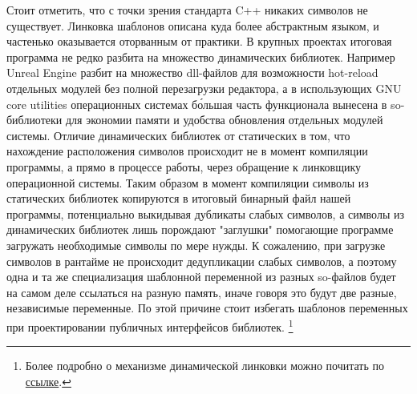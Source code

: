 Стоит отметить, что с точки зрения стандарта C++ никаких символов не существует. Линковка шаблонов описана куда более абстрактным языком, и частенько оказывается оторванным от практики. В крупных проектах итоговая программа не редко разбита на множество динамических библиотек. Например Unreal Engine разбит на множество dll-файлов для возможности hot-reload отдельных модулей без полной перезагрузки редактора, а в использующих GNU core utilities операционных системах б\'{о}льшая часть функционала вынесена в so-библиотеки для экономии памяти и удобства обновления отдельных модулей системы. Отличие динамических библиотек от статических в том, что нахождение расположения символов происходит не в момент компиляции программы, а прямо в процессе работы, через обращение к линковщику операционной системы. Таким образом в момент компиляции символы из статических библиотек копируются в итоговый бинарный файл нашей программы, потенциально выкидывая дубликаты слабых символов, а символы из динамических библиотек лишь порождают "заглушки" помогающие программе загружать необходимые символы по мере нужды. К сожалению, при загрузке символов в рантайме не происходит дедупликации слабых символов, а поэтому одна и та же специализация шаблонной переменной из разных so-файлов будет на самом деле ссылаться на разную память, иначе говоря это будут две разные, независимые переменные. По этой причине стоит избегать шаблонов переменных при проектировании публичных интерфейсов библиотек.
\footnote{Более подробно о механизме динамической линковки можно почитать по \href{https://www.technovelty.org/linux/plt-and-got-the-key-to-code-sharing-and-dynamic-libraries.html}{ссылке}.}


